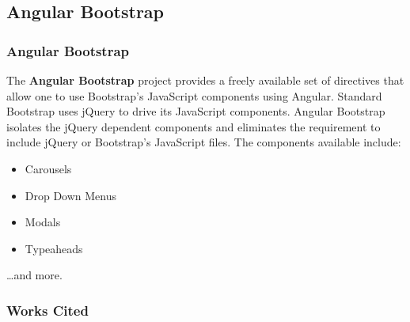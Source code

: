 \documentclass[aspectratio=169]{beamer}
\begin{document}
\subsection{Angular Bootstrap}
\begin{frame}
\frametitle{Angular Bootstrap}
The \textbf{Angular Bootstrap} project provides a freely available set of directives that allow one to use Bootstrap's JavaScript components using Angular. Standard Bootstrap uses jQuery to drive its JavaScript components. Angular Bootstrap isolates the jQuery dependent components and eliminates the requirement to include jQuery or Bootstrap's JavaScript files. The components available include:

\begin{itemize}
	\item Carousels
	\item Drop Down Menus
	\item Modals
	\item Typeaheads
\end{itemize}

\dots and more. \cite{angular-bootstrap}
\end{frame}

\begin{frame}
\frametitle{Works Cited}

\end{frame}
\end{document}
